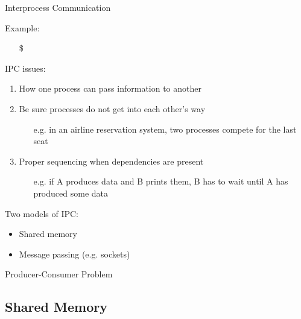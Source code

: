 \begin{frame}{Interprocess Communication}
  \begin{block}{Example:}
    \begin{itemize}
    \item[\$] 
    \end{itemize}
  \end{block}
  \begin{block}{IPC issues:}
    \begin{enumerate}
    \item How one process can pass information to another
    \item Be sure processes do not get into each other's way
      \begin{itemize}
      \item[e.g.] in an airline reservation system, two processes compete for the last
        seat
      \end{itemize}
    \item Proper sequencing when dependencies are present
      \begin{itemize}
      \item[e.g.] if A produces data and B prints them, B has to wait until A has produced
        some data
      \end{itemize}
    \end{enumerate}
  \end{block}
  \begin{block}{Two models of IPC:}
    \begin{itemize}
    \item Shared memory
    \item Message passing (e.g. sockets)
    \end{itemize}
  \end{block}
\end{frame}

\begin{frame}{Producer-Consumer Problem}
\begin{center}
   
\end{center}
\end{frame}

\subsection{Shared Memory}
\label{sec:shared-memory}

